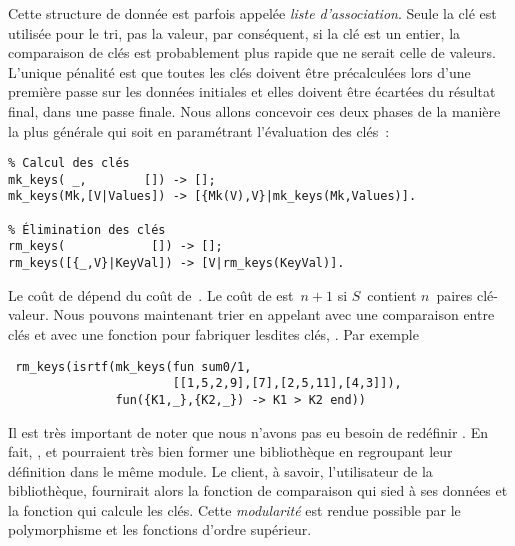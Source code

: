 Cette structure de donnée est parfois appelée \emph{liste
  d'association}. Seule la clé est utilisée pour le tri, pas la
valeur, par conséquent, si la clé est un entier, la comparaison de
clés est probablement plus rapide que ne serait celle de
valeurs. L'unique pénalité est que toutes les clés doivent être
précalculées lors d'une première passe sur les données initiales et
elles doivent être écartées du résultat final, dans une passe finale.
Nous allons concevoir ces deux phases de la manière la plus générale
qui soit en paramétrant l'évaluation des clés~:
\begin{verbatim}
% Calcul des clés
mk_keys( _,        []) -> [];
mk_keys(Mk,[V|Values]) -> [{Mk(V),V}|mk_keys(Mk,Values)].

% Élimination des clés
rm_keys(            []) -> [];
rm_keys([{_,V}|KeyVal]) -> [V|rm_keys(KeyVal)].
\end{verbatim}
Le coût de  dépend du coût de~. Le
coût de  est~\(n+1\) si \(S\)~contient
\(n\)~paires clé-valeur. Nous pouvons maintenant trier en appelant
 avec une comparaison entre clés et avec une fonction
pour fabriquer lesdites clés, . Par exemple
\begin{verbatim}
 rm_keys(isrtf(mk_keys(fun sum0/1,
                       [[1,5,2,9],[7],[2,5,11],[4,3]]),
               fun({K1,_},{K2,_}) -> K1 > K2 end))
\end{verbatim}
Il est très important de noter que nous n'avons pas eu besoin de
redéfinir . En fait, ,
 et  pourraient très bien
former une bibliothèque en regroupant leur définition dans le même
module. Le client, à savoir, l'utilisateur de la bibliothèque,
fournirait alors la fonction de comparaison qui sied à ses données et
la fonction qui calcule les clés. Cette \emph{modularité} est rendue
possible par le polymorphisme et les fonctions d'ordre supérieur.

